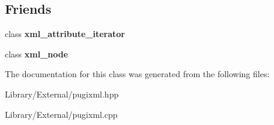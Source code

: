 \subsection*{Friends}
\begin{DoxyCompactItemize}
\item 
\hypertarget{classpugi_1_1xml__attribute_aeff34dec57ee910e3344631528969539}{}class {\bfseries xml\+\_\+attribute\+\_\+iterator}\label{classpugi_1_1xml__attribute_aeff34dec57ee910e3344631528969539}

\item 
\hypertarget{classpugi_1_1xml__attribute_a156d917a92815c7b593bd5ef19f6d5fb}{}class {\bfseries xml\+\_\+node}\label{classpugi_1_1xml__attribute_a156d917a92815c7b593bd5ef19f6d5fb}

\end{DoxyCompactItemize}


The documentation for this class was generated from the following files\+:\begin{DoxyCompactItemize}
\item 
Library/\+External/pugixml.\+hpp\item 
Library/\+External/pugixml.\+cpp\end{DoxyCompactItemize}
